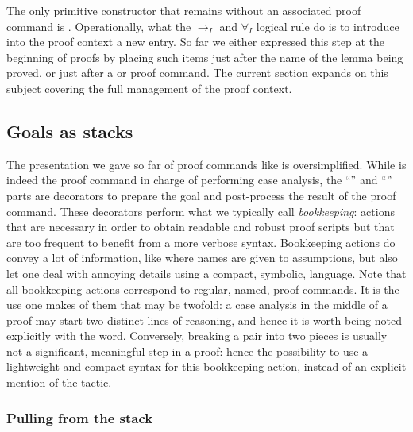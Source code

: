 The only primitive constructor that remains without an associated proof command
is .  Operationally, what the $\to_I$ and
$\forall_I$ logical rule do is to introduce into the proof context a
new entry.  So far we either expressed this step at the beginning of proofs
by placing such items just after the name of the lemma being proved, or
just after a  or  proof command.  The current section
expands on this subject covering the full management of the proof context.

\subsection{Goals as stacks}\label{ssec:stack}

The presentation we gave so far of proof commands like 
is oversimplified.  While  is indeed the proof command in
charge of performing case analysis, the ``'' and ``\C{=> [|m]}''
parts are decorators to prepare the goal and post-process the result of
the proof command.  These decorators perform what we typically call
\emph{bookkeeping}: actions that are necessary in order to obtain readable and
robust proof scripts but that are too frequent to benefit from a more verbose
syntax.  Bookkeeping actions do convey a lot of information, like where
names are given to assumptions, but also let one deal with annoying details
using a compact, symbolic, language.  Note that all bookkeeping actions
correspond to regular, named, proof commands.  It is the use one makes of them
that may be twofold: a case analysis in the middle of a proof may start two
distinct lines of reasoning, and hence it is worth being noted explicitly with
the  word. Conversely, breaking a pair into two pieces is
usually not a significant, meaningful step in a proof: hence the
possibility to use a lightweight and compact syntax for this bookkeeping
action, instead of an explicit mention of the  tactic.

\subsubsection{Pulling from the stack}

